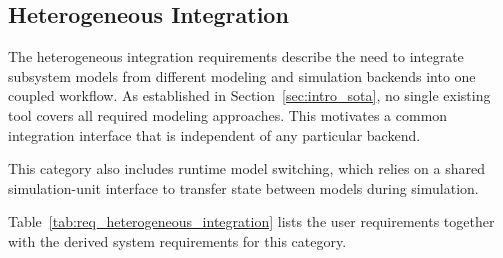 \subsection{Heterogeneous Integration}
\label{sec:req_heterogeneous_integration}

The heterogeneous integration requirements describe the need to integrate subsystem models from different modeling and simulation backends into one coupled workflow.
As established in Section~\ref{sec:intro_sota}, no single existing tool covers all required modeling approaches.
This motivates a common integration interface that is independent of any particular backend.

This category also includes runtime model switching, which relies on a shared simulation-unit interface to transfer state between models during simulation.

Table~\ref{tab:req_heterogeneous_integration} lists the user requirements together with the derived system requirements for this category.

